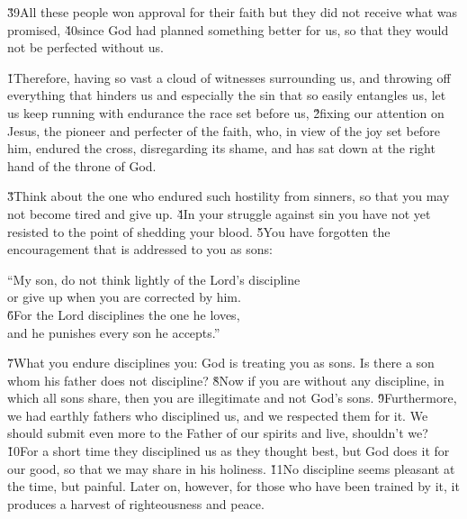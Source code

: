 \v{39}All these people won approval for their faith but they did not receive what was promised, \v{40}since God had planned something better for us, so that they would not be perfected without us.

\v{1}Therefore, having so vast a cloud of witnesses surrounding us, and throwing off everything that hinders us and especially the sin that so easily entangles us, let us keep running with endurance the race set before us, \v{2}fixing our attention on Jesus, the pioneer and perfecter of the faith, who, in view of the joy set before him, endured the cross, disregarding its shame, and has sat down at the right hand of the throne of God.

\v{3}Think about the one who endured such hostility from sinners, so that you may not become tired and give up. \v{4}In your struggle against sin you have not yet resisted to the point of shedding your blood. \v{5}You have forgotten the encouragement that is addressed to you as sons:

\begin{poetry}
\poeml ``My son, do not think lightly of the Lord's discipline \\
\poemll    or give up when you are corrected by him. \\
\poeml \v{6}For the Lord disciplines the one he loves, \\
\poemll    and he punishes every son he accepts.''
\end{poetry}

\v{7}What you endure disciplines you: God is treating you as sons. Is there a son whom his father does not discipline? \v{8}Now if you are without any discipline, in which all sons share, then you are illegitimate and not God's sons. \v{9}Furthermore, we had earthly fathers who disciplined us, and we respected them for it. We should submit even more to the Father of our spirits and live, shouldn't we? \v{10}For a short time they disciplined us as they thought best, but God does it for our good, so that we may share in his holiness. \v{11}No discipline seems pleasant at the time, but painful. Later on, however, for those who have been trained by it, it produces a harvest of righteousness and peace.

